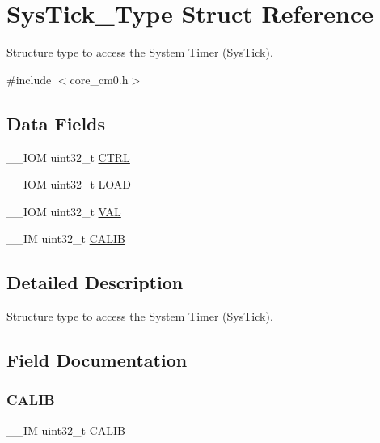 \hypertarget{struct_sys_tick___type}{}\section{Sys\+Tick\+\_\+\+Type Struct Reference}
\label{struct_sys_tick___type}


Structure type to access the System Timer (Sys\+Tick).  




{\ttfamily \#include $<$core\+\_\+cm0.\+h$>$}

\subsection*{Data Fields}
\begin{DoxyCompactItemize}
\item 
\+\_\+\+\_\+\+I\+OM uint32\+\_\+t \hyperlink{struct_sys_tick___type_ac81efc171e9852a36caeb47122bfec5b}{C\+T\+RL}
\item 
\+\_\+\+\_\+\+I\+OM uint32\+\_\+t \hyperlink{struct_sys_tick___type_a0c1333686137b7e25a46bd548a5b5bc3}{L\+O\+AD}
\item 
\+\_\+\+\_\+\+I\+OM uint32\+\_\+t \hyperlink{struct_sys_tick___type_ae7a655a853654127f3dfb7fa32c3f457}{V\+AL}
\item 
\+\_\+\+\_\+\+IM uint32\+\_\+t \hyperlink{struct_sys_tick___type_aedf0dff29a9cacdaa2fb7eec6b116a13}{C\+A\+L\+IB}
\end{DoxyCompactItemize}


\subsection{Detailed Description}
Structure type to access the System Timer (Sys\+Tick). 

\subsection{Field Documentation}
\mbox{\label{struct_sys_tick___type_aedf0dff29a9cacdaa2fb7eec6b116a13}} 
\subsubsection{\texorpdfstring{C\+A\+L\+IB}{CALIB}}
{\footnotesize\ttfamily \+\_\+\+\_\+\+IM uint32\+\_\+t C\+A\+L\+IB}

